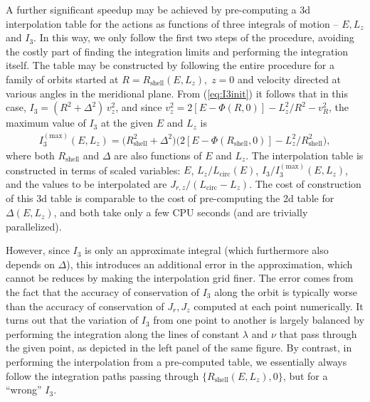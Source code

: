 \documentclass[12pt]{article}
\begin{document}
A further significant speedup may be achieved by pre-computing a 3d interpolation table for the actions as functions of three integrals of motion -- $E, L_z$ and $I_3$. In this way, we only follow the first two steps of the procedure, avoiding the costly part of finding the integration limits and performing the integration itself. The table may be constructed by following the entire procedure for a family of orbits started at $R=R_\mathrm{shell}(E,L_z),\; z=0$ and velocity directed at various angles in the meridional plane. From (\ref{eq:I3init}) it follows that in this case, $I_3 = (R^2+\Delta^2)\,v_z^2$, and since $v_z^2 = 2[E-\Phi(R,0)] - L_z^2/R^2 - v_R^2$, the maximum value of $I_3$ at the given $E$ and $L_z$ is
\begin{align}
I_3^{\mathrm{(max)}}(E, L_z) = \big( R_\mathrm{shell}^2 + \Delta^2 \big)
\big( 2[E-\Phi(R_\mathrm{shell},0)] - L_z^2/R_\mathrm{shell}^2 \big),
\end{align}
where both $R_\mathrm{shell}$ and $\Delta$ are also functions of $E$ and $L_z$.
The interpolation table is constructed in terms of scaled variables: $E$, $L_z / L_\mathrm{circ}(E)$, $I_3 / I_3^{\mathrm{(max)}}(E, L_z)$, and the values to be interpolated are $J_{r,z} / (L_\mathrm{circ}-L_z)$. The cost of construction of this 3d table is comparable to the cost of pre-computing the 2d table for $\Delta(E,L_z)$, and both take only a few CPU seconds (and are trivially parallelized).

However, since $I_3$ is only an approximate integral (which furthermore also depends on $\Delta$), this introduces an additional error in the approximation, which cannot be reduces by making the interpolation grid finer. The error comes from the fact that the accuracy of conservation of $I_3$ along the orbit is typically worse than the accuracy of conservation of $J_r,J_z$ computed at each point numerically. It turns out that the variation of $I_3$ from one point to another is largely balanced by performing the integration along the lines of constant $\lambda$ and $\nu$ that pass through the given point, as depicted in the left panel of the same figure. By contrast, in performing the interpolation from a pre-computed table, we essentially always follow the integration paths passing through $\{R_\mathrm{shell}(E,L_z),0\}$, but for a ``wrong'' $I_3$.
\end{document}
